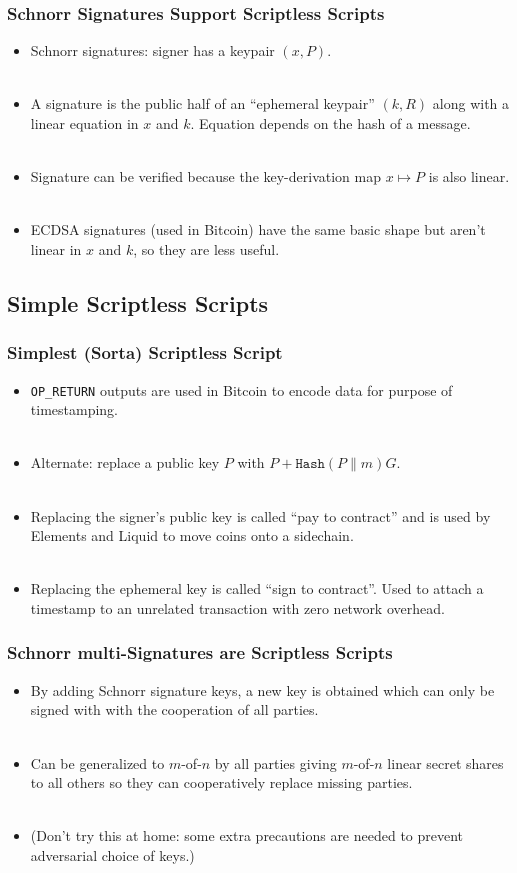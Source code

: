 \documentclass{beamer}
\begin{document}
\frame
{
  \frametitle{Schnorr Signatures Support Scriptless Scripts}
  \begin{itemize}
  \item Schnorr signatures: signer has a keypair $(x, P)$.\\~\\
  \item A signature is the public half of an ``ephemeral keypair'' $(k, R)$
        along with a linear equation in $x$ and $k$. Equation depends on the
        hash of a message.\\~\\
  \item Signature can be verified because the key-derivation map $x\mapsto P$
        is also linear.\\~\\
  \item ECDSA signatures (used in Bitcoin) have the same basic shape but aren't
linear in $x$ and $k$, so they are less useful.
  \end{itemize}
}

\subsection{Simple Scriptless Scripts}
\frame
{
  \frametitle{Simplest (Sorta) Scriptless Script}
  \begin{itemize}
  \item \texttt{OP\_RETURN} outputs are used in Bitcoin to encode data for purpose
        of timestamping.\\~\\
  \item Alternate: replace a public key $P$ with $P + \texttt{Hash}(P\|m)G$.\\~\\
  \item Replacing the signer's public key is called ``pay to contract'' and is used
        by Elements and Liquid to move coins onto a sidechain.\\~\\
  \item Replacing the ephemeral key is called ``sign to contract''. Used to
        attach a timestamp to an unrelated transaction with zero network
        overhead.
  \end{itemize}
}

\frame
{
  \frametitle{Schnorr multi-Signatures are Scriptless Scripts}
  \begin{itemize}
  \item By adding Schnorr signature keys, a new key is obtained which can only
        be signed with with the cooperation of all parties.\\~\\
  \item Can be generalized to $m$-of-$n$ by all parties giving $m$-of-$n$
        linear secret shares to all others so they can cooperatively replace
        missing parties.\\~\\
  \item (Don't try this at home: some extra precautions are needed to prevent
        adversarial choice of keys.) 
  \end{itemize}
}
\end{document}
